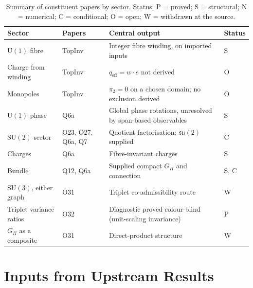 \documentclass[11pt,a4paper]{article}
\theoremstyle{definition}
\newcommand{\SU}{\mathrm{SU}}
\newcommand{\su}{\mathfrak{su}}
\newcommand{\UU}{\mathrm{U}}
\newcommand{\Gpi}{G_{\Pi}}
\begin{document}
      \begin{table}[ht]
        \centering
        \caption{Summary of constituent papers by sector.
        Status: P = proved; S = structural; N = numerical; C = conditional; O = open;
        W = withdrawn at the source.}
        \label{tab:papers}
        \renewcommand{\arraystretch}{1.2}
        \begin{tabular}{@{}llll@{}}
          \toprule
          Sector & Papers & Central output & Status \\
          \midrule
          $\UU(1)$ fibre & TopInv & Integer fibre winding, on imported inputs & S \\
          Charge from winding & TopInv & $q_{\mathrm{eff}} = w \cdot e$ not derived & O \\
          Monopoles & TopInv & $\pi_2 = 0$ on a chosen domain; no exclusion derived & O \\
          $\UU(1)$ phase & Q6a & Global phase rotations, unresolved by span-based observables & S \\
          $\SU(2)$ sector & O23, O27, Q6a, Q7 & Quotient factorisation; $\su(2)$ supplied & C \\
          Charges & Q6a & Fibre-invariant charges & S \\
          Bundle & Q12, Q6a & Supplied compact $\Gpi$ and connection & S, C \\
          $\SU(3)$, either graph & O31 & Triplet co-admissibility route & W \\
          Triplet variance ratios & O32 & Diagnostic proved colour-blind (unit-scaling invariance) & P \\
          $\Gpi$ as a composite & O31 & Direct-product structure & W \\
          \bottomrule
        \end{tabular}
      \end{table}

  \section{Inputs from Upstream Results}
    \label{sec:inputs}
\end{document}
